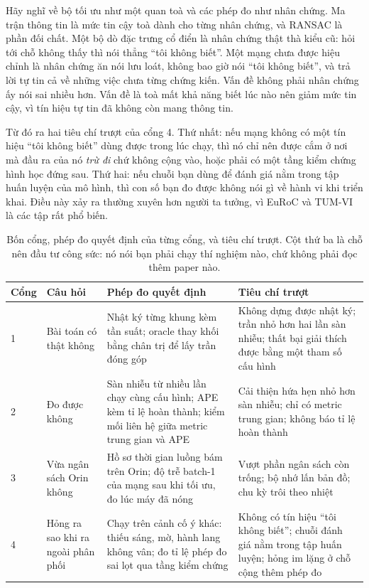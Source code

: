 \documentclass[../../deep_learning.tex]{subfiles}
\begin{document}
\begin{trucgiac}
Hãy nghĩ về bộ tối ưu như một quan toà và các phép đo như nhân chứng. Ma trận thông tin là mức tin cậy toà dành cho từng nhân chứng, và RANSAC là phần đối chất. Một bộ dò đặc trưng cổ điển là nhân chứng thật thà kiểu cũ: hỏi tới chỗ không thấy thì nói thẳng ``tôi không biết''. Một mạng chưa được hiệu chỉnh là nhân chứng ăn nói lưu loát, không bao giờ nói ``tôi không biết'', và trả lời tự tin cả về những việc chưa từng chứng kiến. Vấn đề không phải nhân chứng ấy nói sai nhiều hơn. Vấn đề là toà mất khả năng biết lúc nào nên giảm mức tin cậy, vì tín hiệu tự tin đã không còn mang thông tin.
\end{trucgiac}

Từ đó ra hai tiêu chí trượt của cổng 4. Thứ nhất: nếu mạng không có một tín hiệu ``tôi không biết'' dùng được trong lúc chạy, thì nó chỉ nên được cắm ở nơi mà đầu ra của nó \emph{trừ đi} chứ không cộng vào, hoặc phải có một tầng kiểm chứng hình học đứng sau. Thứ hai: nếu chuỗi bạn dùng để đánh giá nằm trong tập huấn luyện của mô hình, thì con số bạn đo được không nói gì về hành vi khi triển khai. Điều này xảy ra thường xuyên hơn người ta tưởng, vì EuRoC và TUM-VI là các tập rất phổ biến.

\begin{table}[H]\centering\footnotesize
\caption{Bốn cổng, phép đo quyết định của từng cổng, và tiêu chí trượt. Cột thứ ba là chỗ nên đầu tư công sức: nó nói bạn phải chạy thí nghiệm nào, chứ không phải đọc thêm paper nào.}
\label{tab:f27-bon-cong}
\begin{tabularx}{\linewidth}{@{}L{1.55cm}L{3.5cm}YL{4.5cm}@{}}
\toprule
\textbf{Cổng} & \textbf{Câu hỏi} & \textbf{Phép đo quyết định} & \textbf{Tiêu chí trượt}\\
 & Bài toán có thật không & Nhật ký từng khung kèm tần suất; oracle thay khối bằng chân trị để lấy trần đóng góp & Không dựng được nhật ký; trần nhỏ hơn hai lần sàn nhiễu; thất bại giải thích được bằng một tham số cấu hình\\
2 & Đo được không & Sàn nhiễu từ nhiều lần chạy cùng cấu hình; APE kèm tỉ lệ hoàn thành; kiểm mối liên hệ giữa metric trung gian và APE & Cải thiện hứa hẹn nhỏ hơn sàn nhiễu; chỉ có metric trung gian; không báo tỉ lệ hoàn thành\\
3 & Vừa ngân sách Orin không & Hồ sơ thời gian luồng bám trên Orin; độ trễ batch-1 của mạng sau khi tối ưu, đo lúc máy đã nóng & Vượt phần ngân sách còn trống; bộ nhớ lấn bản đồ; chu kỳ trôi theo nhiệt\\
4 & Hỏng ra sao khi ra ngoài phân phối & Chạy trên cảnh cố ý khác: thiếu sáng, mờ, hành lang không vân; đo tỉ lệ phép đo sai lọt qua tầng kiểm chứng & Không có tín hiệu ``tôi không biết''; chuỗi đánh giá nằm trong tập huấn luyện; hỏng im lặng ở chỗ cộng thêm phép đo\\
\bottomrule
\end{tabularx}
\end{table}
\end{document}
